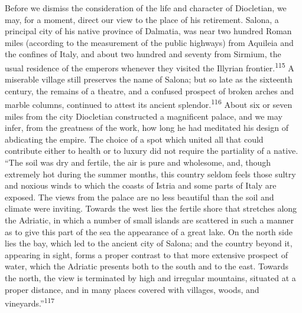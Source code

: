



Before we dismiss the consideration of the life and character of
Diocletian, we may, for a moment, direct our view to the place of
his retirement. Salona, a principal city of his native province
of Dalmatia, was near two hundred Roman miles (according to the
measurement of the public highways) from Aquileia and the
confines of Italy, and about two hundred and seventy from
Sirmium, the usual residence of the emperors whenever they
visited the Illyrian frontier.\textsuperscript{115} A miserable village still
preserves the name of Salona; but so late as the sixteenth
century, the remains of a theatre, and a confused prospect of
broken arches and marble columns, continued to attest its ancient
splendor.\textsuperscript{116} About six or seven miles from the city Diocletian
constructed a magnificent palace, and we may infer, from the
greatness of the work, how long he had meditated his design of
abdicating the empire. The choice of a spot which united all that
could contribute either to health or to luxury did not require
the partiality of a native. “The soil was dry and fertile, the
air is pure and wholesome, and, though extremely hot during the
summer months, this country seldom feels those sultry and noxious
winds to which the coasts of Istria and some parts of Italy are
exposed. The views from the palace are no less beautiful than the
soil and climate were inviting. Towards the west lies the fertile
shore that stretches along the Adriatic, in which a number of
small islands are scattered in such a manner as to give this part
of the sea the appearance of a great lake. On the north side lies
the bay, which led to the ancient city of Salona; and the country
beyond it, appearing in sight, forms a proper contrast to that
more extensive prospect of water, which the Adriatic presents
both to the south and to the east. Towards the north, the view is
terminated by high and irregular mountains, situated at a proper
distance, and in many places covered with villages, woods, and
vineyards.”\textsuperscript{117}

